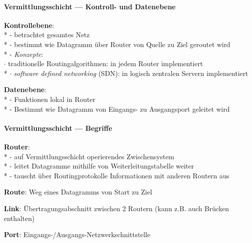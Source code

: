 \paragraph{Vermittlungsschicht --- Kontroll- und Datenebene}
\begin{items}
  \item \textbf{Kontrollebene}: \\*
    - betrachtet gesamtes Netz \\*
    - bestimmt wie Datagramm über Router von Quelle zu Ziel geroutet wird \\*
    - \emph{Konzepte}: \\
    \phantom{-} \( \cdot \) traditionelle Routingalgorithmen: in jedem Router implementiert \\*
    \phantom{-} \( \cdot \) \emph{software defined networking} (SDN): in logisch zentralen Servern implementiert
  \item \textbf{Datenebene}: \\*
    - Funktionen lokal in Router \\*
    - Bestimmt wie Datagramm von Eingangs- zu Ausgangsport geleitet wird
\end{items}

\paragraph{Vermittlungsschicht --- Begriffe}
\begin{items}
  \item \textbf{Router}: \\*
    - auf Vermittlungsschicht operierendes Zwischensystem \\*
    - leitet Datagramme mithilfe von Weiterleitungstabelle weiter \\*
    - tauscht über Routingprotokolle Informationen mit anderen Routern aus
  \item \textbf{Route}: Weg eines Datagramms von Start zu Ziel
  \item \textbf{Link}: Übertragungsabschnitt zwischen 2 Routern (kann z.B. auch Brücken enthalten)
  \item \textbf{Port}: Eingangs-/Ausgangs-Netzwerkschnittstelle
\end{items}

